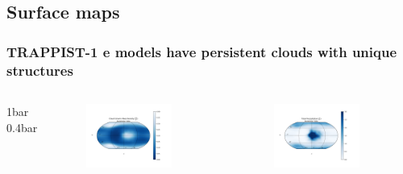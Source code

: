 \documentclass{beamer}
\begin{document}
\subsection{Surface maps}

\begin{frame}
    \frametitle{TRAPPIST-1 e models have persistent clouds with unique
    structures}
    \begin{columns}
        {\tiny 1bar 0.4bar}
        \begin{figure}[topsep=0pt, partopsep=0pt]
        \includegraphics[width=0.8\textwidth]{models/cloud_map.png}
        \end{figure}
        \vspace{-2EM}
        \begin{figure}
        \includegraphics[width=0.8\textwidth]{models/precipitation_map.png}
        \end{figure}

\end{columns}
\end{frame}
\end{document}
